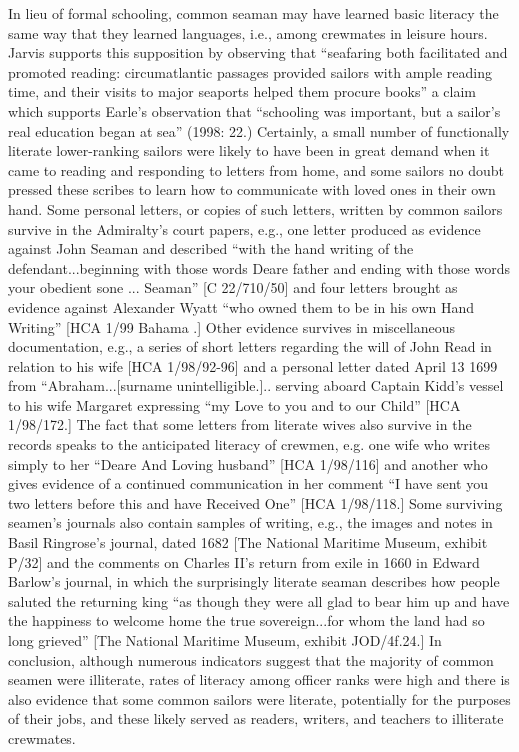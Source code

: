   In lieu of formal schooling, common seaman may have learned basic literacy the same way that they learned languages, i.e., among crewmates in leisure hours. Jarvis supports this supposition by observing that “seafaring both facilitated and promoted reading: circumatlantic passages provided sailors with ample reading time, and their visits to major seaports helped them procure books” \citep[307,]{Jarvis2010} a claim which supports Earle’s observation that “schooling was important, but a sailor’s real education began at sea” (1998: 22.) Certainly, a small number of functionally literate lower-ranking sailors were likely to have been in great demand when it came to reading and responding to letters from home, and some sailors no doubt pressed these scribes to learn how to communicate with loved ones in their own hand. Some personal letters, or copies of such letters, written by common sailors survive in the Admiralty’s court papers, e.g., one letter produced as evidence against John Seaman and described “with the hand writing of the defendant...beginning with those words Deare father and ending with those words your obedient sone ... Seaman” [C 22/710/50] and four letters brought as evidence against Alexander Wyatt “who owned them to be in his own Hand Writing” [HCA 1/99 Bahama \citealt{Islands1722}.] Other evidence survives in miscellaneous documentation, e.g., a series of short letters regarding the will of John Read in relation to his wife [HCA 1/98/92-96] and a personal letter dated April 13 1699 from “Abraham...[surname unintelligible.].. serving aboard Captain Kidd’s vessel to his wife Margaret expressing “my Love to you and to our Child” [HCA 1/98/172.] The fact that some letters from literate wives also survive in the records speaks to the anticipated literacy of crewmen, e.g. one wife who writes simply to her “Deare And Loving husband” [HCA 1/98/116] and another who gives evidence of a continued communication in her comment “I have sent you two letters before this and have Received One” [HCA 1/98/118.] Some surviving seamen’s journals also contain samples of writing, e.g., the images and notes in Basil Ringrose’s journal, dated 1682 [The National Maritime Museum, exhibit P/32] and the comments on Charles II’s return from exile in 1660 in Edward Barlow’s journal, in which the surprisingly literate seaman describes how people saluted the returning king “as though they were all glad to bear him up and have the happiness to welcome home the true sovereign...for whom the land had so long grieved” [The National Maritime Museum, exhibit JOD/4f.24.] In conclusion, although numerous indicators suggest that the majority of common seamen were illiterate, rates of literacy among officer ranks were high and there is also evidence that some common sailors were literate, potentially for the purposes of their jobs, and these likely served as readers, writers, and teachers to illiterate crewmates. 

